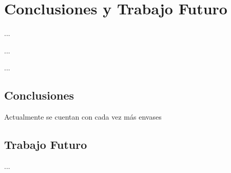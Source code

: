 %
%

\chapter{Conclusiones y Trabajo Futuro}

\begin{FraseCelebre}
\begin{Frase}
...
\end{Frase}
\begin{Fuente}
...
\end{Fuente}
\end{FraseCelebre}

\begin{resumen}
...
\end{resumen}


\section{Conclusiones}
\label{cap6:sec:conclusiones}

Actualmente se cuentan con cada vez más envases 


\section{Trabajo Futuro}
\label{cap6:sec:trabajo-futuro}

...

\section*{\NotasBibliograficas}
\TocNotasBibliograficas






